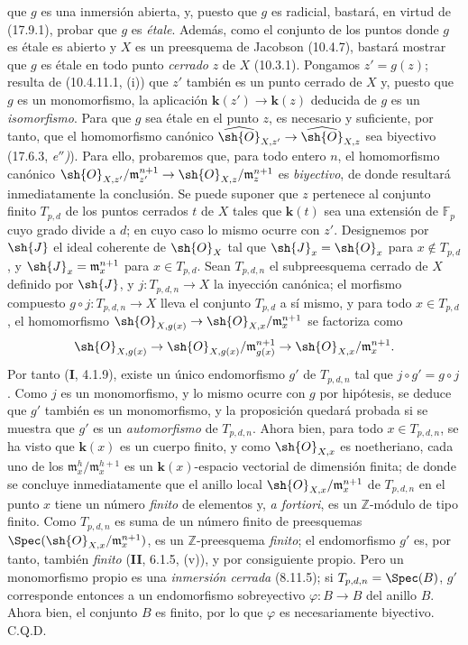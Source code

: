 que $g$ es una inmersión abierta, y, puesto que $g$ es radicial, bastará, en virtud de (17.9.1), probar que $g$ es \emph{étale}. Además, como el conjunto de los puntos donde $g$ es étale es abierto y $X$ es un preesquema de Jacobson (10.4.7), bastará mostrar que $g$ es étale en todo punto \emph{cerrado} $z$ de $X$ (10.3.1). Pongamos $z'=g(z)$; resulta de (10.4.11.1, (i)) que $z'$ también es un punto cerrado de $X$ y, puesto que $g$ es un monomorfismo, la aplicación $\boldsymbol{k}(z')\to\boldsymbol{k}(z)$ deducida de $g$ es un \emph{isomorfismo}. Para que $g$ sea étale en el punto $z$, es necesario y suficiente, por tanto, que el homomorfismo canónico $\widehat{\sh{O}}_{X,z'}\to\widehat{\sh{O}}_{X,z}$ sea biyectivo (17.6.3, \emph{e$''$)}). Para ello, probaremos que, para todo entero $n$, el homomorfismo canónico $\sh{O}_{X,z'}/\mathfrak m_{z'}^{n+1}\to\sh{O}_{X,z}/\mathfrak m_z^{n+1}$ es \emph{biyectivo}, de donde resultará inmediatamente la conclusión. Se puede suponer que $z$ pertenece al conjunto finito $T_{p,d}$ de los puntos cerrados $t$ de $X$ tales que $\boldsymbol{k}(t)$ sea una extensión de $\mathbb{F}_p$ cuyo grado divide a $d$; en cuyo caso lo mismo ocurre con $z'$. Designemos por $\sh{J}$ el ideal coherente de $\sh{O}_X$ tal que $\sh{J}_x=\sh{O}_x$ para $x\notin T_{p,d}$, y $\sh{J}_x=\mathfrak m_x^{n+1}$ para $x\in T_{p,d}$. Sean $T_{p,d,n}$ el subpreesquema cerrado de $X$ definido por $\sh{J}$, y $j:T_{p,d,n}\to X$ la inyección canónica; el morfismo compuesto $g\circ j:T_{p,d,n}\to X$ lleva el conjunto $T_{p,d}$ a sí mismo, y para todo $x\in T_{p,d}$, el homomorfismo $\sh{O}_{X,g(x)}\to\sh{O}_{X,x}/\mathfrak m_x^{n+1}$ se factoriza como
\[
\sh{O}_{X,g(x)}\to\sh{O}_{X,g(x)}/\mathfrak m_{g(x)}^{n+1}\to\sh{O}_{X,x}/\mathfrak m_x^{n+1}.
\]
Por tanto (\textbf{I}, 4.1.9), existe un único endomorfismo $g'$ de $T_{p,d,n}$ tal que $j\circ g'=g\circ j$. Como $j$ es un monomorfismo, y lo mismo ocurre con $g$ por hipótesis, se deduce que $g'$ también es un monomorfismo, y la proposición quedará probada si se muestra que $g'$ es un \emph{automorfismo} de $T_{p,d,n}$. Ahora bien, para todo $x\in T_{p,d,n}$, se ha visto que $\boldsymbol{k}(x)$ es un cuerpo finito, y como $\sh{O}_{X,x}$ es noetheriano, cada uno de los $\mathfrak m_x^h/\mathfrak m_x^{h+1}$ es un $\boldsymbol{k}(x)$-espacio vectorial de dimensión finita; de donde se concluye inmediatamente que el anillo local $\sh{O}_{X,x}/\mathfrak m_x^{n+1}$ de $T_{p,d,n}$ en el punto $x$ tiene un número \emph{finito} de elementos y, \emph{a fortiori}, es un $\mathbb{Z}$-módulo de tipo finito. Como $T_{p,d,n}$ es suma de un número finito de preesquemas $\Spec(\sh{O}_{X,x}/\mathfrak m_x^{n+1})$, es un $\mathbb{Z}$-preesquema \emph{finito}; el endomorfismo $g'$ es, por tanto, también \emph{finito} (\textbf{II}, 6.1.5, (v)), y por consiguiente propio. Pero un monomorfismo propio es una \emph{inmersión cerrada} (8.11.5); si $T_{p,d,n}=\Spec(B)$, $g'$ corresponde entonces a un endomorfismo sobreyectivo $\varphi:B\to B$ del anillo $B$. Ahora bien, el conjunto $B$ es finito, por lo que $\varphi$ es necesariamente biyectivo. C.Q.D.
